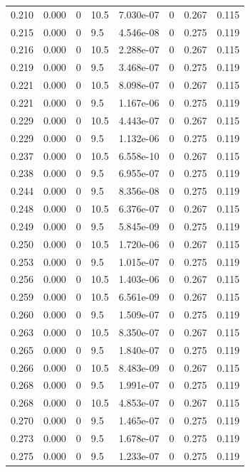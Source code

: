\documentclass[preview]{standalone}
\begin{document}
{{{\begin{tabular}{L{1.2cm}C{1.2cm} C{0.3cm}C{0.5cm} C{1.4cm}C{1.4cm} C{1.4cm}C{1.4cm}}
  0.210  &  0.000  & 0     & 10.5 &  7.030e-07  & 0  & 0.267 &  0.115   \\ 
  0.215  &  0.000  & 0     & 9.5 &  4.546e-08  & 0  & 0.275 &  0.119   \\ 
  0.216  &  0.000  & 0     & 10.5 &  2.288e-07  & 0  & 0.267 &  0.115   \\ 
  0.219  &  0.000  & 0     & 9.5 &  3.468e-07  & 0  & 0.275 &  0.119   \\ 
  0.221  &  0.000  & 0     & 10.5 &  8.098e-07  & 0  & 0.267 &  0.115   \\ 
  0.221  &  0.000  & 0     & 9.5 &  1.167e-06  & 0  & 0.275 &  0.119   \\ 
  0.229  &  0.000  & 0     & 10.5 &  4.443e-07  & 0  & 0.267 &  0.115   \\ 
  0.229  &  0.000  & 0     & 9.5 &  1.132e-06  & 0  & 0.275 &  0.119   \\ 
  0.237  &  0.000  & 0     & 10.5 &  6.558e-10  & 0  & 0.267 &  0.115   \\ 
  0.238  &  0.000  & 0     & 9.5 &  6.955e-07  & 0  & 0.275 &  0.119   \\ 
  0.244  &  0.000  & 0     & 9.5 &  8.356e-08  & 0  & 0.275 &  0.119   \\ 
  0.248  &  0.000  & 0     & 10.5 &  6.376e-07  & 0  & 0.267 &  0.115   \\ 
  0.249  &  0.000  & 0     & 9.5 &  5.845e-09  & 0  & 0.275 &  0.119   \\ 
  0.250  &  0.000  & 0     & 10.5 &  1.720e-06  & 0  & 0.267 &  0.115   \\ 
  0.253  &  0.000  & 0     & 9.5 &  1.015e-07  & 0  & 0.275 &  0.119   \\ 
  0.256  &  0.000  & 0     & 10.5 &  1.403e-06  & 0  & 0.267 &  0.115   \\ 
  0.259  &  0.000  & 0     & 10.5 &  6.561e-09  & 0  & 0.267 &  0.115   \\ 
  0.260  &  0.000  & 0     & 9.5 &  1.509e-07  & 0  & 0.275 &  0.119   \\ 
  0.263  &  0.000  & 0     & 10.5 &  8.350e-07  & 0  & 0.267 &  0.115   \\ 
  0.265  &  0.000  & 0     & 9.5 &  1.840e-07  & 0  & 0.275 &  0.119   \\ 
  0.266  &  0.000  & 0     & 10.5 &  8.483e-09  & 0  & 0.267 &  0.115   \\ 
  0.268  &  0.000  & 0     & 9.5 &  1.991e-07  & 0  & 0.275 &  0.119   \\ 
  0.268  &  0.000  & 0     & 10.5 &  4.853e-07  & 0  & 0.267 &  0.115   \\ 
  0.270  &  0.000  & 0     & 9.5 &  1.465e-07  & 0  & 0.275 &  0.119   \\ 
  0.273  &  0.000  & 0     & 9.5 &  1.678e-07  & 0  & 0.275 &  0.119   \\ 
  0.275  &  0.000  & 0     & 9.5 &  1.233e-07  & 0  & 0.275 &  0.119   \\ 
\hline 
\end{tabular} 

}}}
\end{document}
